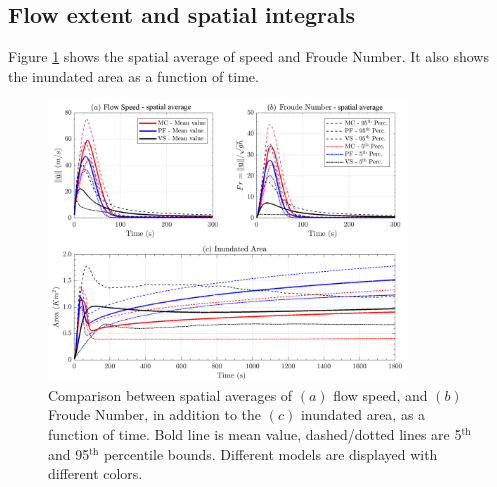 \documentclass{article}
\begin{document}
\subsection{Flow extent and spatial integrals}
Figure \ref{fig:Colima-spatial} shows the spatial average of speed and Froude Number. It also shows the inundated area as a function of time.
\begin{figure}[H]
        \centering
        \includegraphics[width=0.85\textwidth]{BAF_VolcanDeColima/AveragedMeasurments/Averaged_MeasuresColima.png}
        \caption{Comparison between spatial averages of $(a)$ flow speed, and $(b)$ Froude Number, in addition to the $(c)$ inundated area, as a function of time. Bold line is mean value, dashed/dotted lines are 5$^{\mathrm{th}}$ and 95$^{\mathrm{th}}$ percentile bounds. Different models are displayed with different colors.}
        \label{fig:Colima-spatial}
\end{figure}
\end{document}
